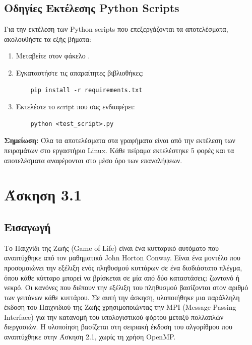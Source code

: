 \documentclass{article}
\begin{document}
\subsection*{Οδηγίες Εκτέλεσης Python Scripts}
Για την εκτέλεση των Python scripts που επεξεργάζονται τα αποτελέσματα, ακολουθήστε τα εξής βήματα:
\begin{enumerate}
    \item Μεταβείτε στον φάκελο .
    \item Εγκαταστήστε τις απαραίτητες βιβλιοθήκες:
    \begin{verbatim}
    pip install -r requirements.txt
    \end{verbatim}
    \item Εκτελέστε το script που σας ενδιαφέρει:
    \begin{verbatim}
    python <test_script>.py
    \end{verbatim}
\end{enumerate}
\textbf{Σημείωση:} Όλα τα αποτελέσματα στα γραφήματα είναι από την εκτέλεση των πειραμάτων στο εργαστήριο Linux. Κάθε πείραμα εκτελέστηκε 5 φορές και τα αποτελέσματα αναφέρονται στο μέσο όρο των επαναλήψεων.
\section*{Άσκηση 3.1}
\subsection*{Εισαγωγή}
Το Παιχνίδι της Ζωής (Game of Life) είναι ένα κυτταρικό αυτόματο που αναπτύχθηκε από τον μαθηματικό John Horton Conway. Είναι ένα μοντέλο που προσομοιώνει την εξέλιξη ενός πληθυσμού κυττάρων σε ένα δισδιάστατο πλέγμα, όπου κάθε κύτταρο μπορεί να βρίσκεται σε μία από δύο καταστάσεις: ζωντανό ή νεκρό. 
Οι κανόνες που διέπουν την εξέλιξη του πληθυσμού βασίζονται στον αριθμό των γειτόνων κάθε κυττάρου.
Σε αυτή την άσκηση, υλοποιήθηκε μια παράλληλη έκδοση του Παιχνιδιού της Ζωής χρησιμοποιώντας την MPI (Message Passing Interface) για την κατανομή του υπολογιστικού φόρτου μεταξύ πολλαπλών διεργασιών. Η υλοποίηση βασίζεται στη σειριακή έκδοση του αλγορίθμου που αναπτύχθηκε στην Άσκηση 2.1, χωρίς τη χρήση OpenMP.
\end{document}
